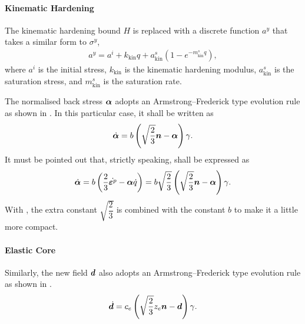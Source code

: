 \paragraph{Kinematic Hardening}
The kinematic hardening bound $H$ is replaced with a discrete function $a^y$ that takes a similar form to $\sigma^y$,
\begin{gather}\label{eq:kin_bone}
    a^y=a^i+k_\text{kin}q+a^s_\text{kin}\left(1-e^{-m^s_\text{kin}q}\right),
\end{gather}
where $a^i$ is the initial stress, $k_\text{kin}$ is the kinematic hardening modulus, $a^s_\text{kin}$ is the saturation stress, and $m^s_\text{kin}$ is the saturation rate.

The normalised back stress $\bm{\alpha}$ adopts an Armstrong--Frederick type \citep{Frederick2007} evolution rule as shown in .
In this particular case, it shall be written as
\begin{gather}\label{eq:normalised_back_rule}
    \dot{\bm{\alpha}}=b\left(\sqrt{\dfrac{2}{3}}\bm{n}-\bm{\alpha}\right)\gamma.
\end{gather}
It must be pointed out that, strictly speaking,  shall be expressed as \citep[e.g.,][Eq.~(2.3.4)]{Simo1998}
\begin{gather}
    \dot{\bm{\alpha}}=b\left(\dfrac{2}{3}\dot{\bm{\varepsilon}^p}-\bm{\alpha}\dot{q}\right)=b\sqrt{\dfrac{2}{3}}\left(\sqrt{\dfrac{2}{3}}\bm{n}-\bm{\alpha}\right)\gamma.
\end{gather}
With , the extra constant $\sqrt{\dfrac{2}{3}}$ is combined with the constant $b$ to make it a little more compact.
\paragraph{Elastic Core}
Similarly, the new field $\bm{d}$ also adopts an Armstrong--Frederick type evolution rule as shown in .
\begin{gather}
\dot{\bm{d}}=c_e\left(\sqrt{\dfrac{2}{3}}z_e\bm{n}-\bm{d}\right)\gamma.
\end{gather}
